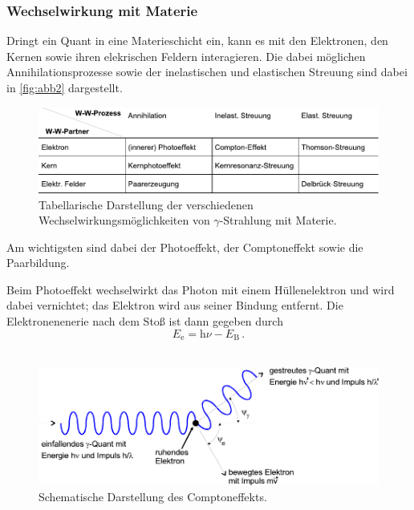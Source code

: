 \subsubsection*{Wechselwirkung mit Materie}

Dringt ein Quant in eine Materieschicht ein, kann es mit den
Elektronen, den Kernen sowie ihren elekrischen Feldern interagieren.
Die dabei möglichen Annihilationsprozesse sowie der inelastischen
und elastischen Streuung sind dabei in \autoref{fig:abb2} dargestellt.

\begin{figure}
    \centering
    \includegraphics{figures/abb2.pdf}
    \caption{Tabellarische Darstellung der verschiedenen Wechselwirkungsmöglichkeiten von $\gamma$-Strahlung mit Materie\cite{ap04}.}
    \label{fig:abb2}
\end{figure}

Am wichtigsten sind dabei der Photoeffekt, der Comptoneffekt sowie
die Paarbildung.

Beim Photoeffekt wechselwirkt das Photon mit einem Hüllenelektron und
wird dabei vernichtet; das Elektron wird aus seiner Bindung entfernt.
Die Elektronenenerie nach dem Stoß ist dann gegeben durch
\begin{equation*}
    E_{\mathrm{e}} = \mathrm{h} \nu - E_{\mathrm{B}} \,.
\end{equation*} \\

\begin{figure}[H]
    \centering
    \includegraphics{figures/abb3.pdf}
    \caption{Schematische Darstellung des Comptoneffekts\cite{ap04}.}
    \label{fig:abb3}
\end{figure}

